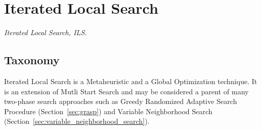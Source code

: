 

\section{Iterated Local Search} 
\label{sec:iterated_local_search}

\emph{Iterated Local Search, ILS.}

\subsection{Taxonomy}
Iterated Local Search is a Metaheuristic and a Global Optimization technique.
It is an extension of Mutli Start Search and may be considered a parent of many two-phase search approaches such as Greedy Randomized Adaptive Search Procedure (Section~\ref{sec:grasp}) and Variable Neighborhood Search (Section~\ref{sec:variable_neighborhood_search}).

